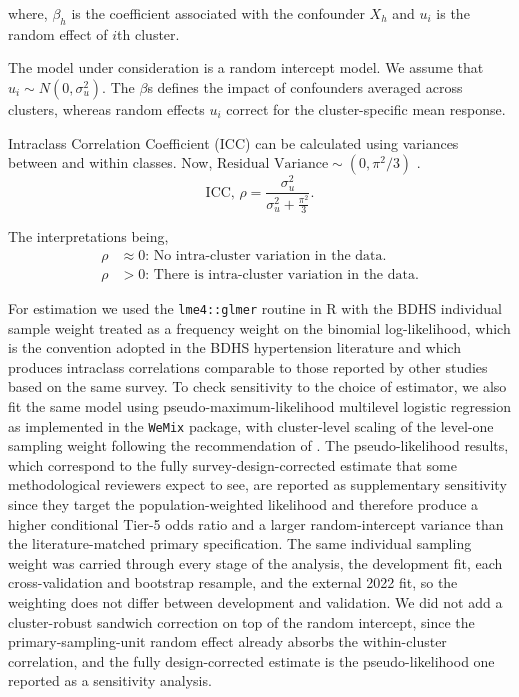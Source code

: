 \documentclass[
  12pt,
  a4paper]{article}
\begin{document}
\noindent
where, \(\beta_h\) is the coefficient associated with the confounder \(X_h\) and \(u_i\) is the random effect of \(i\)th cluster.

The model under consideration is a random intercept model. We assume that \(u_i \sim N(0,\sigma_u^2)\). The \(\beta\)s defines the impact of confounders averaged across clusters, whereas random effects \(u_i\) correct for the cluster-specific mean response.

Intraclass Correlation Coefficient (ICC) can be calculated using variances between and within classes. Now, \(\text{Residual Variance} \sim (0,\pi^2/3)\) \citep{powers2008statistical}.
\[\text{ICC,  }\rho=\frac{\sigma^2_u} {\sigma^2_u+\frac{\pi^2}{3}}. \tag{3.2}\]

The interpretations being,
\[\begin{aligned} \rho &\approx 0 \text{: No intra-cluster variation in the data. } \\
\rho &> 0 \text{: There is intra-cluster variation in the data.} \end{aligned}\]

For estimation we used the \texttt{lme4::glmer} routine in R with the BDHS individual sample weight treated as a frequency weight on the binomial log-likelihood, which is the convention adopted in the BDHS hypertension literature and which produces intraclass correlations comparable to those reported by other studies based on the same survey. To check sensitivity to the choice of estimator, we also fit the same model using pseudo-maximum-likelihood multilevel logistic regression as implemented in the \texttt{WeMix} package, with cluster-level scaling of the level-one sampling weight following the recommendation of \citet{rabe_hesketh_2006}. The pseudo-likelihood results, which correspond to the fully survey-design-corrected estimate that some methodological reviewers expect to see, are reported as supplementary sensitivity since they target the population-weighted likelihood and therefore produce a higher conditional Tier-5 odds ratio and a larger random-intercept variance than the literature-matched primary specification. The same individual sampling weight was carried through every stage of the analysis, the development fit, each cross-validation and bootstrap resample, and the external 2022 fit, so the weighting does not differ between development and validation. We did not add a cluster-robust sandwich correction on top of the random intercept, since the primary-sampling-unit random effect already absorbs the within-cluster correlation, and the fully design-corrected estimate is the pseudo-likelihood one reported as a sensitivity analysis.
\end{document}
